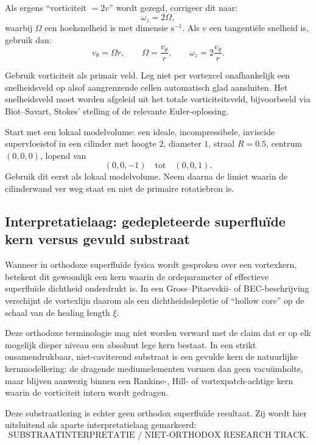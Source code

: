 \documentclass[11pt]{article}
\begin{document}
        Als ergens ``vorticiteit \(=2v\)'' wordt gezegd, corrigeer dit naar:
        \[
            \omega_z=2\Omega,
        \]
        waarbij \(\Omega\) een hoeksnelheid is met dimensie \(\mathrm{s^{-1}}\).
        Als \(v\) een tangentiële snelheid is, gebruik dan:
        \[
            v_{\theta}=\Omega r,
            \qquad
            \Omega=\frac{v_{\theta}}{r},
            \qquad
            \omega_z=2\frac{v_{\theta}}{r}.
        \]
        
        Gebruik vorticiteit als primair veld. Leg niet per vortexcel onafhankelijk een snelheidsveld op alsof aangrenzende cellen automatisch glad aansluiten. Het snelheidsveld moet worden afgeleid uit het totale vorticiteitsveld, bijvoorbeeld via Biot--Savart, Stokes' stelling of de relevante Euler-oplossing.
        
        Start met een lokaal modelvolume: een ideale, incompressibele, inviscide supervloeistof in een cilinder met hoogte \(2\), diameter \(1\), straal \(R=0.5\), centrum \((0,0,0)\), lopend van
        \[
            (0,0,-1)
            \quad\text{tot}\quad
            (0,0,1).
        \]
        Gebruik dit eerst als lokaal modelvolume. Neem daarna de limiet waarin de cilinderwand ver weg staat en niet de primaire rotatiebron is.
    \subsection*{Interpretatielaag: gedepleteerde superfluïde kern versus gevuld substraat}
        
        Wanneer in orthodoxe superfluïde fysica wordt gesproken over een vortexkern, betekent dit gewoonlijk een kern waarin de ordeparameter of effectieve superfluïde dichtheid onderdrukt is. In een Gross--Pitaevskii- of BEC-beschrijving verschijnt de vortexlijn daarom als een dichtheidsdepletie of ``hollow core'' op de schaal van de healing length \(\xi\).
        
        Deze orthodoxe terminologie mag niet worden verward met de claim dat er op elk mogelijk dieper niveau een absoluut lege kern bestaat. In een strikt onsamendrukbaar, niet-caviterend substraat is een gevulde kern de natuurlijke kernmodellering: de dragende mediumelementen vormen dan geen vacuümholte, maar blijven aanwezig binnen een Rankine-, Hill- of vortexpatch-achtige kern waarin de vorticiteit intern wordt gedragen.
        
        Deze substraatlezing is echter geen orthodox superfluïde resultaat. Zij wordt hier uitsluitend als aparte interpretatielaag gemarkeerd:
        \[
            \boxed{
                \text{SUBSTRAATINTERPRETATIE / NIET-ORTHODOX RESEARCH TRACK}.
            }
        \]
        
\end{document}

